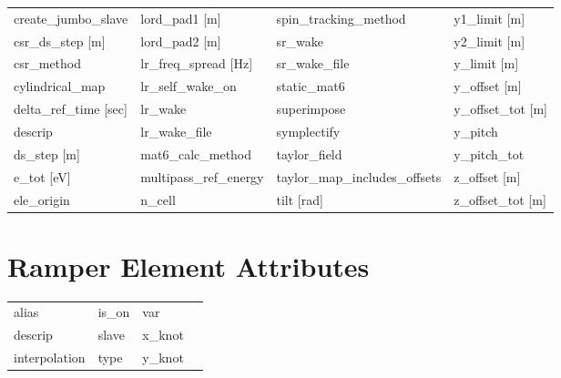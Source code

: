 \begin{tabular}{llll}
create_jumbo_slave               & lord_pad1 [m]                    & spin_tracking_method             & y1_limit [m]                     \\
csr_ds_step [m]                  & lord_pad2 [m]                    & sr_wake                          & y2_limit [m]                     \\
csr_method                       & lr_freq_spread [Hz]              & sr_wake_file                     & y_limit [m]                      \\
cylindrical_map                  & lr_self_wake_on                  & static_mat6                      & y_offset [m]                     \\
delta_ref_time [sec]             & lr_wake                          & superimpose                      & y_offset_tot [m]                 \\
descrip                          & lr_wake_file                     & symplectify                      & y_pitch                          \\
ds_step [m]                      & mat6_calc_method                 & taylor_field                     & y_pitch_tot                      \\
e_tot [eV]                       & multipass_ref_energy             & taylor_map_includes_offsets      & z_offset [m]                     \\
ele_origin                       & n_cell                           & tilt [rad]                       & z_offset_tot [m]                 \\
 \bottomrule
 \end{tabular}
 \vfill
 
 \section{Ramper Element Attributes}
 \label{s:list.ramper}
 
 \begin{tabular}{llll} \toprule
alias                            & is_on                            & var                              &                                  \\
descrip                          & slave                            & x_knot                           &                                  \\
interpolation                    & type                             & y_knot                           &                                  \\
 \bottomrule
 \end{tabular}
 \vfill
 
